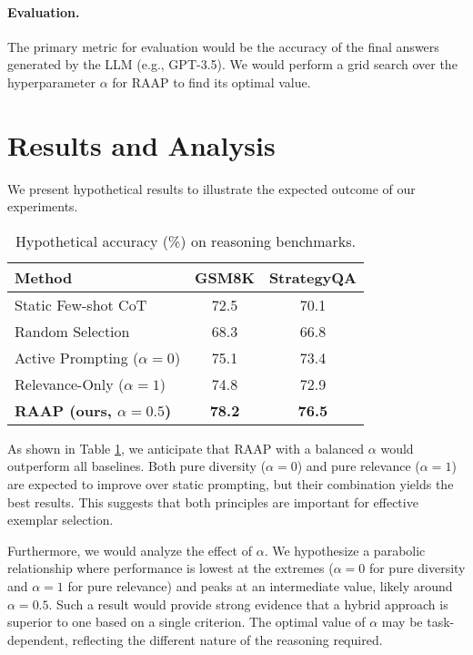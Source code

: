 \documentclass[10pt,twocolumn,letterpaper]{article}
\begin{document}
\paragraph{Evaluation.}
The primary metric for evaluation would be the accuracy of the final answers generated by the LLM (e.g., GPT-3.5). We would perform a grid search over the hyperparameter $\alpha$ for RAAP to find its optimal value.

\section{Results and Analysis}

We present hypothetical results to illustrate the expected outcome of our experiments.

\begin{table}[h]
\centering
\caption{Hypothetical accuracy (\%) on reasoning benchmarks.}
\label{tab:results}
\begin{tabular}{lcc}
\hline
\textbf{Method} & \textbf{GSM8K} & \textbf{StrategyQA} \\
\hline
Static Few-shot CoT & 72.5 & 70.1 \\
Random Selection & 68.3 & 66.8 \\
\hline
Active Prompting ($\alpha=0$) & 75.1 & 73.4 \\
Relevance-Only ($\alpha=1$) & 74.8 & 72.9 \\
\textbf{RAAP (ours, $\alpha=0.5$)} & \textbf{78.2} & \textbf{76.5} \\
\hline
\end{tabular}
\end{table}

As shown in Table \ref{tab:results}, we anticipate that RAAP with a balanced $\alpha$ would outperform all baselines. Both pure diversity ($\alpha=0$) and pure relevance ($\alpha=1$) are expected to improve over static prompting, but their combination yields the best results. This suggests that both principles are important for effective exemplar selection.

Furthermore, we would analyze the effect of $\alpha$. We hypothesize a parabolic relationship where performance is lowest at the extremes ($\alpha=0$ for pure diversity and $\alpha=1$ for pure relevance) and peaks at an intermediate value, likely around $\alpha=0.5$. Such a result would provide strong evidence that a hybrid approach is superior to one based on a single criterion. The optimal value of $\alpha$ may be task-dependent, reflecting the different nature of the reasoning required.
\end{document}
